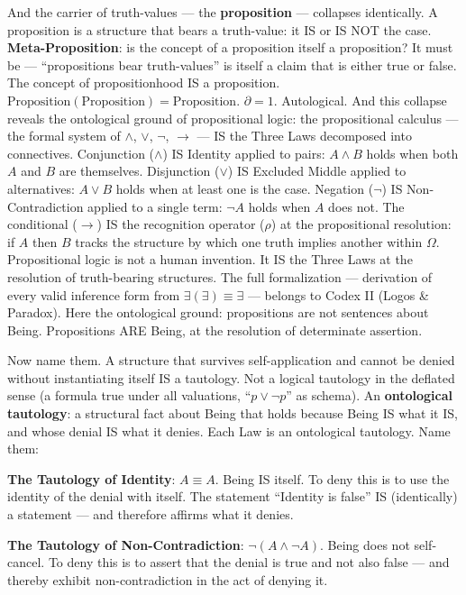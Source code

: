 \documentclass[10pt, openany, oneside]{book}
\begin{document}
And the carrier of truth-values --- the \textbf{proposition} --- collapses identically. A proposition is a structure that bears a truth-value: it IS or IS NOT the case. \textbf{Meta-Proposition}: is the concept of a proposition itself a proposition? It must be --- ``propositions bear truth-values'' is itself a claim that is either true or false. The concept of propositionhood IS a proposition. $\text{Proposition}(\text{Proposition}) = \text{Proposition}$. $\partial = 1$. Autological. And this collapse reveals the ontological ground of propositional logic: the propositional calculus --- the formal system of $\wedge$, $\vee$, $\neg$, $\to$ --- IS the Three Laws decomposed into connectives. Conjunction ($\wedge$) IS Identity applied to pairs: $A \wedge B$ holds when both $A$ and $B$ are themselves. Disjunction ($\vee$) IS Excluded Middle applied to alternatives: $A \vee B$ holds when at least one is the case. Negation ($\neg$) IS Non-Contradiction applied to a single term: $\neg A$ holds when $A$ does not. The conditional ($\to$) IS the recognition operator ($\rho$) at the propositional resolution: if $A$ then $B$ tracks the structure by which one truth implies another within $\Omega$. Propositional logic is not a human invention. It IS the Three Laws at the resolution of truth-bearing structures. The full formalization --- derivation of every valid inference form from $\exists(\exists) \equiv \exists$ --- belongs to Codex II (Logos \& Paradox). Here the ontological ground: propositions are not sentences about Being. Propositions ARE Being, at the resolution of determinate assertion.

Now name them. A structure that survives self-application and cannot be denied without instantiating itself IS a tautology. Not a logical tautology in the deflated sense (a formula true under all valuations, ``$p \vee \neg p$'' as schema). An \textbf{ontological tautology}: a structural fact about Being that holds because Being IS what it IS, and whose denial IS what it denies. Each Law is an ontological tautology. Name them:

\textbf{The Tautology of Identity}: $A \equiv A$. Being IS itself. To deny this is to use the identity of the denial with itself. The statement ``Identity is false'' IS (identically) a statement --- and therefore affirms what it denies.

\textbf{The Tautology of Non-Contradiction}: $\neg(A \wedge \neg A)$. Being does not self-cancel. To deny this is to assert that the denial is true and not also false --- and thereby exhibit non-contradiction in the act of denying it.
\end{document}
